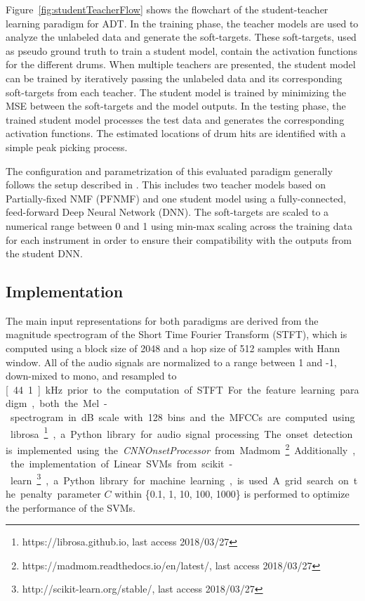 \documentclass{article}
\newcommand{\comment}[1]{{\textcolor{blue}{#1}}}
\begin{document}
Figure~\ref{fig:studentTeacherFlow} shows the flowchart of the student-teacher learning paradigm for ADT. In the training phase, the teacher models are used to analyze the unlabeled data and generate the soft-targets. These soft-targets, used as pseudo ground truth to train a student model, contain the activation functions for the different drums. 
When multiple teachers are presented, the student model can be trained by iteratively passing the unlabeled data and its corresponding soft-targets from each teacher. The student model is trained by minimizing the MSE between the soft-targets and the model outputs. 
In the testing phase, the trained student model processes the test data and generates the corresponding activation functions. The estimated locations of drum hits are identified with a simple peak picking process. 

The configuration and parametrization of this evaluated paradigm generally follows the setup described in \cite{Wu2017}. This includes two teacher models based on Partially-fixed NMF (PFNMF) \cite{Wu2015_ismir} and one student model using a fully-connected, feed-forward Deep Neural Network (DNN). The soft-targets are scaled to a numerical range between 0 and 1 using min-max scaling across the training data for each instrument in order to ensure their compatibility with the outputs from the student DNN. 
\subsection{Implementation}
The main input representations for both paradigms are derived from the magnitude spectrogram of the Short Time Fourier Transform (STFT), which is computed using a block size of 2048 and a hop size of 512 samples with Hann window. All of the audio signals are normalized to a range between 1 and -1, down-mixed to mono, and resampled to \unit[44.1]{kHz} prior to the computation of STFT. %

For the feature learning paradigm, both the Mel-spectrogram in dB scale with 128 bins and the MFCCs are computed using librosa\footnote{https://librosa.github.io, last access 2018/03/27}, a Python library for audio signal processing. The onset detection is implemented using the \textit{CNNOnsetProcessor} from Madmom\footnote{https://madmom.readthedocs.io/en/latest/, last access 2018/03/27}. Additionally, the implementation of Linear SVMs from scikit-learn\footnote{http://scikit-learn.org/stable/, last access 2018/03/27}, a Python library for machine learning, is used. A grid search on the penalty parameter $C$ within \{0.1, 1, 10, 100, 1000\} is performed to optimize the performance of the SVMs. 
\end{document}
